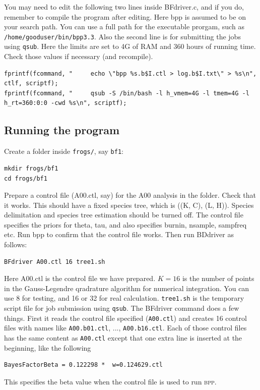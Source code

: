 \documentclass[a4paper]{book}
\numberwithin{equation}{section} \renewcommand{\baselinestretch}{0.55}
\begin{document}
You may need to edit the following two lines inside BFdriver.c, and if
you do, remember to compile the program after editing.  Here bpp is
assumed to be on your search path.  You can use a full path for the
executable prorgam, such as \texttt{/home/gooduser/bin/bpp3.3}.  Also
the second line is for submitting the jobs using \texttt{qsub}.  Here
the limits are set to 4G of RAM and 360 hours of running time.  Check
those values if necessary (and recompile).
\begin{verbatim}
fprintf(fcommand, "     echo \"bpp %s.b$I.ctl > log.b$I.txt\" > %s\n", ctlf, scriptf);
fprintf(fcommand, "     qsub -S /bin/bash -l h_vmem=4G -l tmem=4G -l h_rt=360:0:0 -cwd %s\n", scriptf);
\end{verbatim}

\subsection{Running the program }

Create a folder inside \texttt{frogs/}, say \texttt{bf1}:
\begin{verbatim}
mkdir frogs/bf1
cd frogs/bf1
\end{verbatim}

Prepare a control file (A00.ctl, say) for the A00 analysis in the
folder.  Check that it works.  This should have a fixed species tree,
which is ((K, C), (L, H)).  Species delimitation and species tree
estimation should be turned off.  The control file specifies the
priors for theta, tau, and also specifies burnin, nsample, sampfreq
etc.  Run bpp to confirm that the control file works.  Then run
BDdriver as follows:

\begin{verbatim}
BFdriver A00.ctl 16 tree1.sh
\end{verbatim}

Here A00.ctl is the control file we have prepared.  $K = 16$ is the
number of points in the Gauss-Legendre qradrature algorithm for
numerical integration.  You can use 8 for testing, and 16 or 32 for
real calculation.  \texttt{tree1.sh} is the temporary script file for
job submission using \texttt{qsub}.  The BFdriver command does a few
things.  First it reads the control file specified (\texttt{A00.ctl})
and creates 16 control files with names like \texttt{A00.b01.ctl},
..., \texttt{A00.b16.ctl}.  Each of those control files has the same
content as \texttt{A00.ctl} except that one extra line is inserted at
the beginning, like the following
\begin{verbatim}
BayesFactorBeta = 0.122298 *  w=0.124629.ctl
\end{verbatim}
This specifies the beta value when the control file is used to run
\textsc{bpp}.
\end{document}
